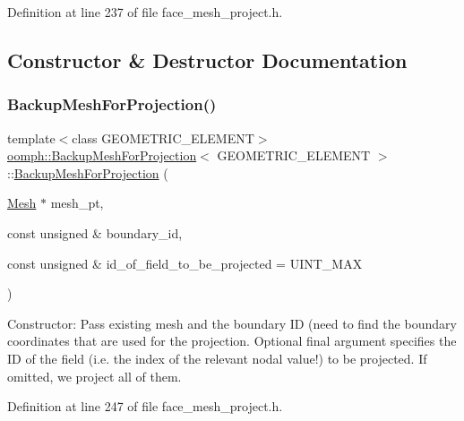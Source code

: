 Definition at line 237 of file face\+\_\+mesh\+\_\+project.\+h.



\subsection{Constructor \& Destructor Documentation}
\mbox{\label{classoomph_1_1BackupMeshForProjection_a15032c7709e65ad4e1d00a6406786c6c}} 
\subsubsection{\texorpdfstring{Backup\+Mesh\+For\+Projection()}{BackupMeshForProjection()}}
{\footnotesize\ttfamily template$<$class G\+E\+O\+M\+E\+T\+R\+I\+C\+\_\+\+E\+L\+E\+M\+E\+NT$>$ \\
\hyperlink{classoomph_1_1BackupMeshForProjection}{oomph\+::\+Backup\+Mesh\+For\+Projection}$<$ G\+E\+O\+M\+E\+T\+R\+I\+C\+\_\+\+E\+L\+E\+M\+E\+NT $>$\+::\hyperlink{classoomph_1_1BackupMeshForProjection}{Backup\+Mesh\+For\+Projection} (\begin{DoxyParamCaption}\item[{\hyperlink{classoomph_1_1Mesh}{Mesh} $\ast$}]{mesh\+\_\+pt,  }\item[{const unsigned \&}]{boundary\+\_\+id,  }\item[{const unsigned \&}]{id\+\_\+of\+\_\+field\+\_\+to\+\_\+be\+\_\+projected = {\ttfamily UINT\+\_\+MAX} }\end{DoxyParamCaption})\hspace{0.3cm}{\ttfamily [inline]}}



Constructor\+: Pass existing mesh and the boundary ID (need to find the boundary coordinates that are used for the projection. Optional final argument specifies the ID of the field (i.\+e. the index of the relevant nodal value!) to be projected. If omitted, we project all of them. 



Definition at line 247 of file face\+\_\+mesh\+\_\+project.\+h.



